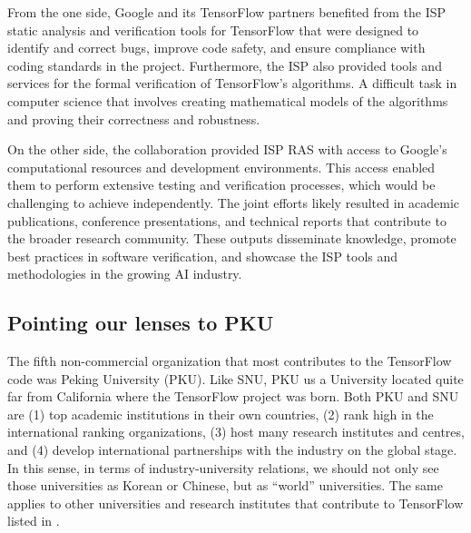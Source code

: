 \documentclass[CHICAGO,Times1COL]{WileyNJDv5} %
\begin{document}
From the one side, Google and its TensorFlow partners benefited from the ISP static analysis and verification tools for TensorFlow that were designed to identify and correct bugs, improve code safety, and ensure compliance with coding standards in the project. Furthermore, the ISP also provided tools and services for the formal verification of TensorFlow's algorithms. A difficult task in computer science that involves creating mathematical models of the algorithms and proving their correctness and robustness.

On the other side, the collaboration provided ISP RAS with access to Google's computational resources and development environments. This access enabled them to perform extensive testing and verification processes, which would be challenging to achieve independently. The joint efforts likely resulted in academic publications, conference presentations, and technical reports that contribute to the broader research community. These outputs disseminate knowledge, promote best practices in software verification, and showcase the ISP tools and methodologies in the growing \ac{AI} industry.

\subsection{Pointing our lenses to PKU}




The fifth non-commercial organization that most contributes to the TensorFlow code was Peking  University (PKU). Like SNU, PKU us a University located quite far from California where the TensorFlow project was born. Both PKU and SNU are (1) top academic institutions in their own countries, (2) rank high in the international ranking organizations, (3) host many research institutes and centres, and (4) develop international partnerships with the industry on the global stage. In this sense, in terms of industry-university relations, we should not only see those universities as Korean or Chinese, but as ``world'' universities. The same applies to other universities and research institutes that contribute to TensorFlow listed in . 
\end{document}
